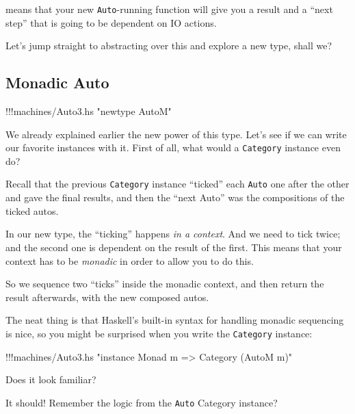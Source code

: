 \documentclass[]{article}
\newenvironment{Shaded}{}{}
\newcommand{\StringTok}[1]{\textcolor[rgb]{0.25,0.44,0.63}{{#1}}}
\newcommand{\FunctionTok}[1]{\textcolor[rgb]{0.02,0.16,0.49}{{#1}}}
\newcommand{\NormalTok}[1]{{#1}}
\begin{document}
means that your new \texttt{Auto}-running function will give you a
result and a ``next step'' that is going to be dependent on IO actions.

Let's jump straight to abstracting over this and explore a new type,
shall we?

\subsection{Monadic Auto}\label{monadic-auto}

\begin{Shaded}
\begin{Highlighting}[]
\FunctionTok{!!!}\NormalTok{machines}\FunctionTok{/}\NormalTok{Auto3.hs }\StringTok{"newtype AutoM"}
\end{Highlighting}
\end{Shaded}

We already explained earlier the new power of this type. Let's see if we
can write our favorite instances with it. First of all, what would a
\texttt{Category} instance even do?

Recall that the previous \texttt{Category} instance ``ticked'' each
\texttt{Auto} one after the other and gave the final results, and then
the ``next Auto'' was the compositions of the ticked autos.

In our new type, the ``ticking'' happens \emph{in a context}. And we
need to tick twice; and the second one is dependent on the result of the
first. This means that your context has to be \emph{monadic} in order to
allow you to do this.

So we sequence two ``ticks'' inside the monadic context, and then return
the result afterwards, with the new composed autos.

The neat thing is that Haskell's built-in syntax for handling monadic
sequencing is nice, so you might be surprised when you write the
\texttt{Category} instance:

\begin{Shaded}
\begin{Highlighting}[]
\FunctionTok{!!!}\NormalTok{machines}\FunctionTok{/}\NormalTok{Auto3.hs }\StringTok{"instance Monad m => Category (AutoM m)"}
\end{Highlighting}
\end{Shaded}

Does it look familiar?

It should! Remember the logic from the \texttt{Auto} Category instance?
\end{document}

